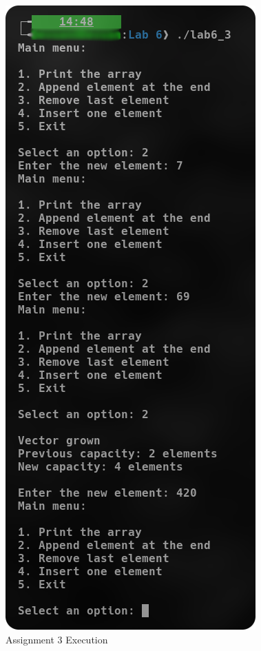 \documentclass[
	letterpaper, %
	10pt, %
]{CSUniSchoolLabReport}
\begin{document}
  \begin{figure}[H]
    \centering
    \includegraphics[height=.9\textheight]{Figures/6_3.png}
    \caption{Assignment 3 Execution}
    \label{fig:4}
  \end{figure}
\end{document}
